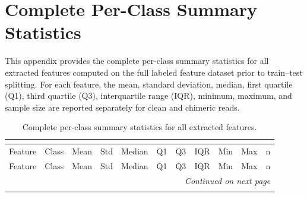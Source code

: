 \chapter{Complete Per-Class Summary Statistics}
\label{app:summary_stats}

This appendix provides the complete per-class summary statistics for all extracted features computed on the full labeled feature dataset prior to train--test splitting. For each feature, the mean, standard deviation, median, first quartile (Q1), third quartile (Q3), interquartile range (IQR), minimum, maximum, and sample size are reported separately for clean and chimeric reads.

\begin{landscape}
\scriptsize
\setlength{\tabcolsep}{4.5pt}
\renewcommand{\arraystretch}{1.25}
\setlength{\LTleft}{0pt plus 1fil}
\setlength{\LTright}{0pt plus 1fil}

\begin{center}
\begin{longtable}{llrrrrrrrrr}
\caption{Complete per-class summary statistics for all extracted features.}\\
\label{tab:feature_summary_full}\\

\toprule
Feature & Class & Mean & Std & Median & Q1 & Q3 & IQR & Min & Max & n \\
\midrule
\endfirsthead

\toprule
Feature & Class & Mean & Std & Median & Q1 & Q3 & IQR & Min & Max & n \\
\midrule
\endhead

\midrule
\multicolumn{11}{r}{\textit{Continued on next page}}\\
\endfoot

\bottomrule
\endlastfoot


\end{longtable}
\end{center}
\end{landscape}
